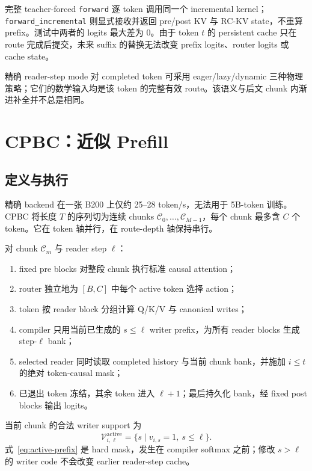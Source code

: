 \documentclass[UTF8,twocolumn,10pt,a4paper]{ctexart}
\newcommand{\RCKV}{\textsf{RC-KV}}
\newcommand{\CPBC}{\textsf{CPBC}}
\newcommand{\code}[1]{\texttt{#1}}
\begin{document}
完整 teacher-forced \code{forward} 逐 token 调用同一个 incremental kernel；\code{forward\_incremental} 则显式接收并返回 pre/post KV 与 \RCKV{} state，不重算 prefix。测试中两者的 logits 最大差为 0。由于 token $t$ 的 persistent cache 只在 route 完成后提交，未来 suffix 的替换无法改变 prefix logits、router logits 或 cache state。

精确 reader-step mode 对 completed token 可采用 eager/lazy/dynamic 三种物理策略；它们的数学输入均是该 token 的完整有效 route。该语义与后文 chunk 内渐进补全并不总是相同。

\section{CPBC：近似 Prefill}
\subsection{定义与执行}
精确 backend 在一张 B200 上仅约 25--28 token/s，无法用于 5B-token 训练。\CPBC{} 将长度 $T$ 的序列切为连续 chunks $\mathcal C_0,\ldots,\mathcal C_{M-1}$，每个 chunk 最多含 $C$ 个 token。它在 token 轴并行，在 route-depth 轴保持串行。

对 chunk $\mathcal C_m$ 与 reader step $\ell$：
\begin{enumerate}
  \item fixed pre blocks 对整段 chunk 执行标准 causal attention；
  \item router 独立地为 $[B,C]$ 中每个 active token 选择 action；
  \item token 按 reader block 分组计算 Q/K/V 与 canonical writes；
  \item compiler 只用当前已生成的 $s\le\ell$ writer prefix，为所有 reader blocks 生成 step-$\ell$ bank；
  \item selected reader 同时读取 completed history 与当前 chunk bank，并施加 $i\le t$ 的绝对 token-causal mask；
  \item 已退出 token 冻结，其余 token 进入 $\ell+1$；最后持久化 bank，经 fixed post blocks 输出 logits。
\end{enumerate}

当前 chunk 的合法 writer support 为
\begin{equation}
  \mathcal V^{\mathrm{active}}_{i,\ell}
  =\{s\mid v_{i,s}=1,\ s\le\ell\}.
  \label{eq:active-prefix}
\end{equation}
式~\eqref{eq:active-prefix} 是 hard mask，发生在 compiler softmax 之前；修改 $s>\ell$ 的 writer code 不会改变 earlier reader-step cache。
\end{document}

